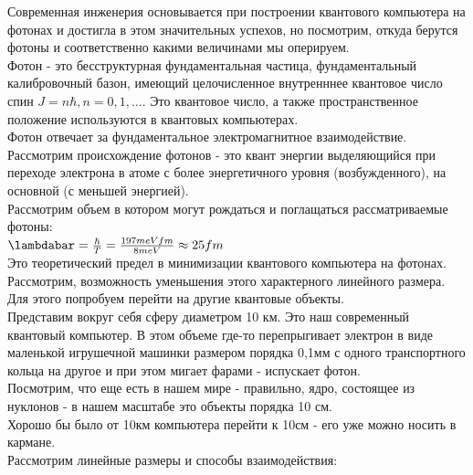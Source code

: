 \documentclass[11pt]{report}
\begin{document}
Современная инженерия основывается при построении квантового компьютера на фотонах и достигла в этом значительных успехов, но посмотрим, откуда берутся фотоны и соответственно какими величинами мы оперируем. \\

Фотон - это бесструктурная фундаментальная частица, фундаментальный калибровочный базон, имеющий целочисленное внутренннее квантовое число спин $J=n\hbar , n=0,1, \dots $. Это квантовое число, а также пространственное положение используются в квантовых компьютерах. \\

Фотон отвечает за фундаментальное электромагнитное взаимодействие. \\

Рассмотрим происхождение фотонов - это квант энергии выделяющийся при переходе электрона в атоме с более энергетичного уровня (возбужденного), на основной (с меньшей энергией). \\

Рассмотрим объем в котором могут рождаться и поглащаться рассматриваемые фотоны:\\

$\lambdabar=\frac{\hbar}{T}= \frac{197meVfm}{8meV} \approx 25fm$ \\

Это теоретический предел в минимизации квантового компьютера на фотонах. \\

Рассмотрим, возможность уменьшения этого характерного линейного размера. Для этого попробуем перейти на другие квантовые объекты. \\

Представим вокруг себя сферу диаметром 10 км. Это наш современный квантовый компьютер. В этом объеме где-то перепрыгивает электрон в виде маленькой игрушечной машинки размером порядка 0,1мм с одного транспортного кольца на другое и при этом мигает фарами - испускает фотон.\\

Посмотрим, что еще есть в нашем мире - правильно, ядро, состоящее из нуклонов - в нашем масштабе это объекты порядка 10 см.\\ 

Хорошо бы было от 10км компьютера перейти к 10см - его уже можно носить в кармане.\\

Рассмотрим линейные размеры и способы взаимодействия:
\end{document}
